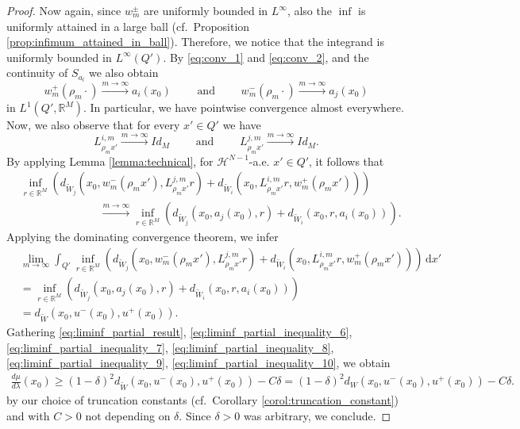 \documentclass[a4paper, 11pt, reqno]{amsart}
\theoremstyle{plain}
\theoremstyle{definition}
\theoremstyle{remark}
\newcommand{\R}{\mathbb R}
\renewcommand{\H}{\mathcal H}
\begin{document}
\begin{proof}
    Now again, since $w_m^\pm$ are uniformly bounded in $L^\infty$, also the $\inf$ is uniformly attained in a large ball (cf.\ Proposition \ref{prop:infimum_attained_in_ball}). Therefore, we notice that the integrand is uniformly bounded in $L^\infty(Q')$. By \eqref{eq:conv_1} and \eqref{eq:conv_2}, and the continuity of $S_{a_l}$ we also obtain
    \[
        w_m^+(\rho_m \cdot ) \xrightarrow{m \to \infty} a_i(x_0) \qquad \text{ and } \qquad  w_m^-(\rho_m \cdot ) \xrightarrow{m \to \infty} a_j(x_0)
    \]
    in $L^1(Q', \R^M)$. In particular, we have pointwise convergence almost everywhere. Now, we also observe that for every $x' \in Q'$ we have 
    \[
        L^{i,m}_{\rho_m x'} \xrightarrow{m \to \infty} Id_{M} \qquad \text{ and } \qquad L^{j,m}_{\rho_m x'} \xrightarrow{m \to \infty} Id_{M}.
    \]
    By applying Lemma \ref{lemma:technical}, for $\H^{N-1}$-a.e. $x' \in Q'$, it follows that
    \begin{align*}
        &\inf_{r \in \R^M} \left( d_{\widetilde W_j}(x_0, w_m^-(\rho_m x'), L^{j,m}_{\rho_m x'}r) + d_{\widetilde W_i}(x_0, L^{i,m}_{\rho_m x'}r, w_m^+(\rho_m x')) \right)  \\
        & \hspace{3cm} \xrightarrow{m \to \infty}  \inf_{r \in \R^M} \left( d_{\widetilde W_j}(x_0, a_j(x_0), r) + d_{\widetilde W_i}(x_0, r, a_i(x_0)) \right).
    \end{align*}
    Applying the dominating convergence theorem, we infer 
    \begin{align}\label{eq:liminf_partial_inequality_10}
        & \lim_{m \to \infty} \int_{Q'} \inf_{r \in \R^M} \left( d_{\widetilde W_j}(x_0, w_m^-(\rho_m x'), L^{j,m}_{\rho_m x'}r) + d_{\widetilde W_i}(x_0, L^{i,m}_{\rho_m x'}r, w_m^+(\rho_m x')) \right) \, \mathrm{d}x' \nonumber \\
        & = \inf_{r \in \R^M} \left(  d_{\widetilde W_j}(x_0, a_j(x_0), r) + d_{\widetilde W_i}(x_0, r, a_i(x_0))\right) \nonumber \\
        & = d_{\widetilde W}(x_0, u^-(x_0), u^+(x_0)). 
    \end{align}
    Gathering \eqref{eq:liminf_partial_result}, \eqref{eq:liminf_partial_inequality_6}, \eqref{eq:liminf_partial_inequality_7}, \eqref{eq:liminf_partial_inequality_8}, \eqref{eq:liminf_partial_inequality_9}, \eqref{eq:liminf_partial_inequality_10}, we obtain  
    \begin{align*}
        \frac{d\mu}{d\lambda}(x_0) \geq (1-\delta)^2d_{\widetilde W}(x_0, u^-(x_0), u^+(x_0)) - C\delta = (1-\delta)^2d_{ W}(x_0, u^-(x_0), u^+(x_0)) - C\delta. 
    \end{align*}
    by our choice of truncation constants (cf.\ Corollary \ref{corol:truncation_constant}) and with $C > 0$ not depending on $\delta$.  
    Since $\delta > 0$ was arbitrary, we conclude.
\end{proof}
\end{document}
